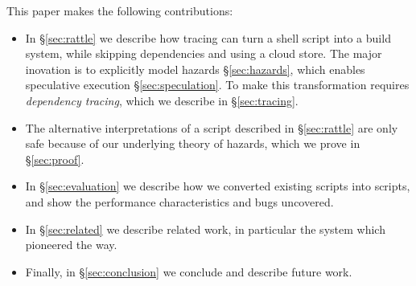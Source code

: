 This paper makes the following contributions:

\begin{itemize}
\item In \S\ref{sec:rattle} we describe how tracing can turn a shell script into a build system, while skipping dependencies and using a cloud store. The major inovation is to explicitly model hazards \S\ref{sec:hazards}, which enables speculative execution \S\ref{sec:speculation}. To make this transformation requires \emph{dependency tracing}, which we describe in \S\ref{sec:tracing}.
\item The alternative interpretations of a script described in \S\ref{sec:rattle} are only safe because of our underlying theory of hazards, which we prove in \S\ref{sec:proof}.
\item In \S\ref{sec:evaluation} we describe how we converted existing \Make scripts into \Rattle scripts, and show the performance characteristics and bugs uncovered.
\item In \S\ref{sec:related} we describe related work, in particular the \Fabricate system which pioneered the way.
\item Finally, in \S\ref{sec:conclusion} we conclude and describe future work.
\end{itemize}

